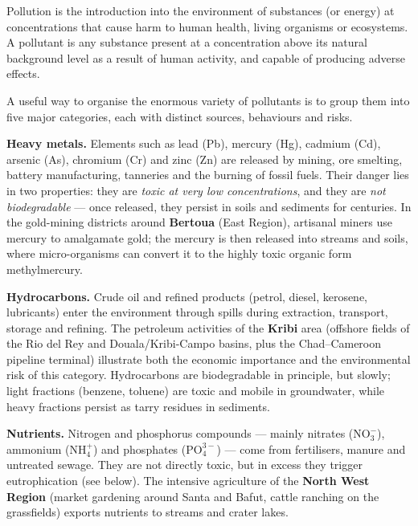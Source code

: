 \documentclass[11pt]{article}
\newcommand{\cle}[1]{{\popxbold\color{popdark}#1}}
\begin{document}
\begin{definition}
\cle{Pollution} is the introduction into the environment of substances (or energy) at concentrations that cause harm to human health, living organisms or ecosystems. A \cle{pollutant} is any substance present at a concentration above its natural background level as a result of human activity, and capable of producing adverse effects.
\end{definition}

A useful way to organise the enormous variety of pollutants is to group them into five major categories, each with distinct sources, behaviours and risks.

\textbf{Heavy metals.} Elements such as lead (Pb), mercury (Hg), cadmium (Cd), arsenic (As), chromium (Cr) and zinc (Zn) are released by mining, ore smelting, battery manufacturing, tanneries and the burning of fossil fuels. Their danger lies in two properties: they are \emph{toxic at very low concentrations}, and they are \emph{not biodegradable} — once released, they persist in soils and sediments for centuries. In the gold-mining districts around \textbf{Bertoua} (East Region), artisanal miners use mercury to amalgamate gold; the mercury is then released into streams and soils, where micro-organisms can convert it to the highly toxic organic form \cle{methylmercury}.

\textbf{Hydrocarbons.} Crude oil and refined products (petrol, diesel, kerosene, lubricants) enter the environment through spills during extraction, transport, storage and refining. The petroleum activities of the \textbf{Kribi} area (offshore fields of the Rio del Rey and Douala/Kribi-Campo basins, plus the Chad–Cameroon pipeline terminal) illustrate both the economic importance and the environmental risk of this category. Hydrocarbons are biodegradable in principle, but slowly; light fractions (benzene, toluene) are toxic and mobile in groundwater, while heavy fractions persist as tarry residues in sediments.

\textbf{Nutrients.} Nitrogen and phosphorus compounds — mainly nitrates ($\mathrm{NO_3^-}$), ammonium ($\mathrm{NH_4^+}$) and phosphates ($\mathrm{PO_4^{3-}}$) — come from fertilisers, manure and untreated sewage. They are not directly toxic, but in excess they trigger \cle{eutrophication} (see below). The intensive agriculture of the \textbf{North West Region} (market gardening around Santa and Bafut, cattle ranching on the grassfields) exports nutrients to streams and crater lakes.
\end{document}
